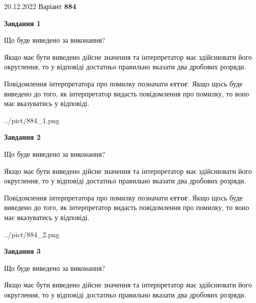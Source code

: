 \documentclass[12pt, ukrainian]{article}
\begin{document}
{20.12.2022 Варіант \No \textbf { 884 }\par}
{
\begin {Large}

{\begin {center}\textbf{Завдання 1}\end {center}}\par
Що буде виведено за виконання? \par

Якщо має бути виведено дійсне значення та інтерпретатор має здійснювати його округлення, 
то у відповіді достатньо правильно вказати два дробових розряди.

Повідомлення інтерпретатора про помилку позначати \textbf{error}.
Якщо щось буде виведено до того, як інтерпретатор видасть повідомлення про помилку, 
то воно має вказуватись у відповіді. \par

\begin{center}
	{../pict/884_1.png}
\end{center}
\newpage

{\begin {center}\textbf{Завдання 2}\end {center}}\par
Що буде виведено за виконання? \par

Якщо має бути виведено дійсне значення та інтерпретатор має здійснювати його округлення, 
то у відповіді достатньо правильно вказати два дробових розряди.

Повідомлення інтерпретатора про помилку позначати \textbf{error}.
Якщо щось буде виведено до того, як інтерпретатор видасть повідомлення про помилку, 
то воно має вказуватись у відповіді. \par

\begin{center}
	{../pict/884_2.png}
\end{center}
\newpage

{\begin {center}\textbf{Завдання 3}\end {center}}\par
Що буде виведено за виконання? \par

Якщо має бути виведено дійсне значення та інтерпретатор має здійснювати його округлення, 
то у відповіді достатньо правильно вказати два дробових розряди.


\end{Large}}
\end{document}
